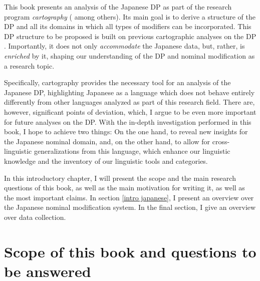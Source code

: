 \documentclass [output=book,colorlinks,citecolor=brown]{langscibook}
\begin{document}
This book presents an analysis of the Japanese DP as part of the research program \textit{cartography} (\citealt{pollock:1989:verb, cinque:1993:evidence, rizzi:1997:the, cinque:1999:adverbs, cinque:2006:complement, cinque:2010:adj, cinque:2017:micro, cinque:2020:relcl, cinque:2023:linearization} among others). Its main goal is to derive a structure of the DP and all its domains in which all types of modifiers can be incorporated. This DP structure to be proposed is built on previous cartographic analyses on the DP \citep{cinque:1993:evidence, cinque:2010:adj, cinque:2020:relcl, svenonius:2008:position, laenzlinger:2005:french, laenzlinger:2011:elements, kim:2019:syntax}. Importantly, it does not only \textit{accommodate} the Japanese data, but, rather, is \textit{enriched} by it, shaping our understanding of the DP and nominal modification as a research topic.

Specifically, cartography provides the necessary tool for an analysis of the Japanese DP, highlighting Japanese as a language which does not behave entirely differently from other languages analyzed as part of this research field. There are, however, significant points of deviation, which, I argue to be even more important for future analyses on the DP. With the in-depth investigation performed in this book, I hope to achieve two things: On the one hand, to reveal new insights for the Japanese nominal domain, and, on the other hand, to allow for cross-linguistic generalizations from this language, which enhance our linguistic knowledge and the inventory of our linguistic tools and categories.

In this introductory chapter, I will present the scope and the main research questions of this book, as well as the main motivation for writing it, as well as the most important claims. In section \ref{intro japanese}, I present an overview over the Japanese nominal modification system. In the final section, I give an overview over data collection.

\newpage

\section{Scope of this book and questions to be answered}
\end{document}
